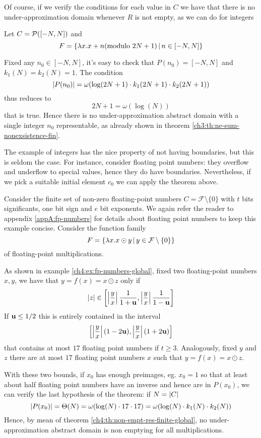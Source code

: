 Of course, if we verify the conditions for each value in $C$ we have that there is no under-approximation domain whenever $R$ is not empty, as we can do for integers
\begin{example}
	Let $C = \mathcal{P}([-N, N])$ and
	\[
	F = \{ \lambda x. x + n (\text{modulo } 2N+1) \,\vert\, n \in [-N, N] \}
	\]

	Fixed any $n_0 \in [-N, N]$, it's easy to check that $P(n_0) = [-N, N]$ and $k_1(N) = k_2(N) = 1$. The condition
	\[
	\lvert P(n_0)\rvert = \omega(\log(2N + 1) \cdot k_1(2N + 1) \cdot k_2(2N + 1))
	\]
	thus reduces to
	\[
	2N + 1 = \omega(\log(N))
	\]
	that is true. Hence there is no under-approximation abstract domain with a single integer $n_0$ representable, as already shown in theorem \ref{ch3:th:ne-sum-nonexsistence-fin}.
\end{example}
The example of integers has the nice property of not having boundaries, but this is seldom the case. For instance, consider floating point numbers: they overflow and underflow to special values, hence they do have boundaries. Nevertheless, if we pick a suitable initial element $c_0$ we can apply the theorem above.

\begin{example}
	Consider the finite set of non-zero floating-point numbers $C = \mathcal{F} \setminus \{ 0 \}$ with $t$ bits significants, one bit sign and $e$ bit exponents. We again refer the reader to appendix \ref{appA:fp-numbers} for details about floating point numbers to keep this example concise.
	Consider the function family
	\[
	F = \{ \lambda x . x \odot y \,\vert\, y \in \mathcal{F} \setminus \{ 0 \} \}
	\]
	of floating-point multiplications.

	As shown in example \ref{ch4:ex:fp-numbers-global}, fixed two floating-point numbers $x, y$, we have that $y = f(x) = x \odot z$ only if
	\[
	\lvert z\rvert \in \left[ \left\lvert\frac{y}{x}\right\rvert \frac{1}{1+\textbf{u}}, \left\lvert\frac{y}{x}\right\rvert \frac{1}{1-\textbf{u}} \right]
	\]
	If $\textbf{u} \le 1 / 2$ this is entirely contained in the interval
	\[
	\left[ \left\lvert\frac{y}{x}\right\rvert (1 - 2 \textbf{u}), \left\lvert\frac{y}{x}\right\rvert (1 + 2 \textbf{u}) \right]
	\]
	that contains at most $17$ floating point numbers if $t \ge 3$.
	Analogously, fixed $y$ and $z$ there are at most $17$ floating point numbers $x$ such that $y = f(x) = x \odot z$.

	With these two bounds, if $x_0$ has enough preimages, eg. $x_0 = 1$ so that at least about half floating point numbers have an inverse and hence are in $P(x_0)$, we can verify the last hypothesis of the theorem: if $N = \lvert C\rvert$
	\[
	\lvert P(x_0)\rvert = \Theta(N) = \omega(\log(N) \cdot 17 \cdot 17) = \omega(\log(N) \cdot k_1(N) \cdot k_2(N))
	\]
	Hence, by mean of theorem \ref{ch4:th:non-empt-res-finite-global}, no under-approximation abstract domain is non emptying for all multiplications.
\end{example}
